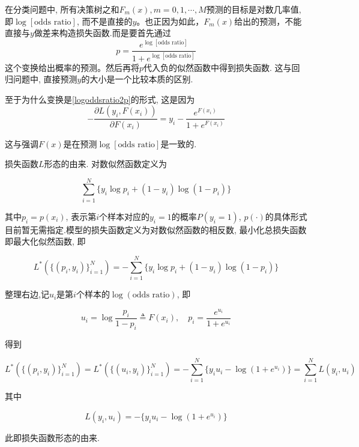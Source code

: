 \begin{remark}
    在分类问题中, 所有决策树之和$F_m(x), m=0,1,\cdots, M$预测的目标是对数几率值, 即$\log[\text{odds ratio}]$, 而不是直接的$y$。也正因为如此，$F_m(x)$给出的预测，不能直接与$y$做差来构造损失函数.而是要首先通过
    \begin{equation}\label{logoddsratio2p}
        p = \frac{e^{\log[\text{odds ratio}]}}{1 + e^{\log[\text{odds ratio}]}}
    \end{equation}
    这个变换给出概率的预测。然后再将$p$代入负的似然函数中得到损失函数. 这与回归问题中, 直接预测$y$的大小是一个比较本质的区别.

    至于为什么变换是\ref{logoddsratio2p}的形式, 这是因为
    \begin{equation}
        -\frac{\partial L(y_i, F(x_i))}{\partial F(x_i)} = y_i - \frac{e^{F(x_i)}}{1 + e^{F(x_i)}}
    \end{equation}

    这与强调$F(x)$是在预测$\log[\text{odds ratio}]$是一致的.
\end{remark}

\begin{remark}
    损失函数$L$形态的由来. 对数似然函数定义为

    \begin{equation*}
        \sum_{i=1}^N\Big\{y_i\log p_i + (1 - y_i)\log (1 - p_i)\Big\}
    \end{equation*}

    其中$p_i=p(x_i)$, 表示第$i$个样本对应的$y_i=1$的概率$P(y_i=1)$, $p(\cdot)$的具体形式目前暂无需指定.模型的损失函数定义为对数似然函数的相反数, 最小化总损失函数即最大化似然函数, 即

    \begin{equation*}
        L^*(\{(p_i, y_i)\}_{i=1}^N) = -\sum_{i=1}^N\Big\{y_i\log p_i + (1 - y_i)\log (1 - p_i)\Big\}
    \end{equation*}

    整理右边,记$u_i$是第$i$个样本的$\log(\text{odds ratio})$, 即

    \begin{equation*}
        u_i = \log\frac{p_i}{1 - p_i} \triangleq F(x_i),\quad p_i = \frac{e^{u_i}}{1 + e^{u_i}}
    \end{equation*}

    得到

    \begin{equation*}
        L^*(\{(p_i, y_i)\}_{i=1}^N) = L^*(\{(u_i, y_i)\}_{i=1}^N) = -\sum_{i=1}^N\Big\{y_iu_i - \log(1 + e^{u_i}) \Big\} = \sum_{i=1}^NL(y_i,u_i)
    \end{equation*}

    其中

    \begin{equation*}
        L(y_i, u_i) = -\Big\{y_iu_i - \log(1 + e^{u_i})\Big\}
    \end{equation*}

    此即损失函数形态的由来.

\end{remark}


